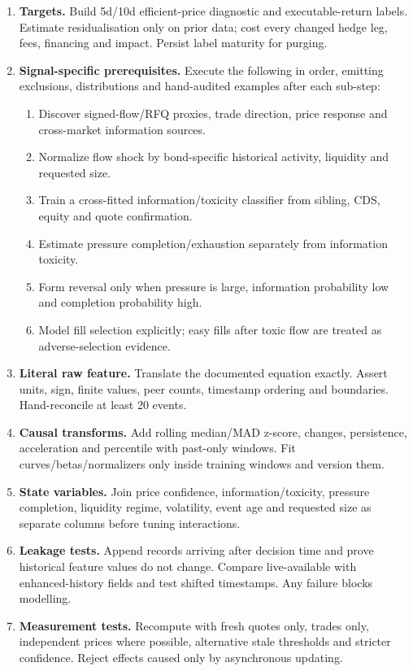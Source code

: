 \documentclass[10pt]{article}
\begin{document}
\begin{enumerate}[leftmargin=2em,label=\textbf{A\arabic*.}]
\item \textbf{Targets.} Build 5d/10d efficient-price diagnostic and executable-return labels. Estimate residualisation only on prior data; cost every changed hedge leg, fees, financing and impact. Persist label maturity for purging.
\item \textbf{Signal-specific prerequisites.} Execute the following in order, emitting exclusions, distributions and hand-audited examples after each sub-step:
\begin{enumerate}[label=\alph*)]
\item Discover signed-flow/RFQ proxies, trade direction, price response and cross-market information sources.
\item Normalize flow shock by bond-specific historical activity, liquidity and requested size.
\item Train a cross-fitted information/toxicity classifier from sibling, CDS, equity and quote confirmation.
\item Estimate pressure completion/exhaustion separately from information toxicity.
\item Form reversal only when pressure is large, information probability low and completion probability high.
\item Model fill selection explicitly; easy fills after toxic flow are treated as adverse-selection evidence.
\end{enumerate}
\item \textbf{Literal raw feature.} Translate the documented equation exactly. Assert units, sign, finite values, peer counts, timestamp ordering and boundaries. Hand-reconcile at least 20 events.
\item \textbf{Causal transforms.} Add rolling median/MAD z-score, changes, persistence, acceleration and percentile with past-only windows. Fit curves/betas/normalizers only inside training windows and version them.
\item \textbf{State variables.} Join price confidence, information/toxicity, pressure completion, liquidity regime, volatility, event age and requested size as separate columns before tuning interactions.
\item \textbf{Leakage tests.} Append records arriving after decision time and prove historical feature values do not change. Compare live-available with enhanced-history fields and test shifted timestamps. Any failure blocks modelling.
\item \textbf{Measurement tests.} Recompute with fresh quotes only, trades only, independent prices where possible, alternative stale thresholds and stricter confidence. Reject effects caused only by asynchronous updating.

\end{enumerate}
\end{document}
